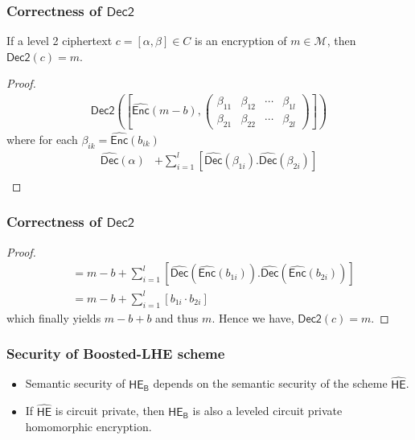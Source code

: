 \documentclass{beamer}
\begin{document}
\begin{frame}[t]
\frametitle{Correctness of $\mathsf{Dec2}$}
\begin{theorem}
If a level 2 ciphertext $c=[\alpha,\beta] \in C$ is an encryption of $m \in \mathcal{M}$, then $\mathsf{Dec2}(c)=m$.
\end{theorem}
\begin{proof}
\begin{align*}
\mathsf{Dec2}([\widehat{\mathsf{Enc}}(m-b), \left(\begin{array}{cccc} {\beta_{11}} & {\beta_{12}} & \cdots & {\beta_{1l}} \\ {\beta_{21}} & {\beta_{22}} & \cdots & {\beta_{2l}} \end{array} \right)])\nonumber
\end{align*}
where for each $\beta_{ik}=\widehat{\mathsf{Enc}}(b_{ik})$
\begin{align*}
\widehat{\mathsf{Dec}}(\alpha)&+\sum_{i=1}^l[ \widehat{\mathsf{Dec}}(\beta_{1i} ). \widehat{\mathsf{Dec}}(\beta_{2i} )]\nonumber\\ 
\end{align*}
\end{proof}
\end{frame}

\begin{frame}[t]
\frametitle{Correctness of $\mathsf{Dec2}$}
\begin{proof}
\begin{align*}
&= m-b+\sum_{i=1}^l [\widehat{\mathsf{Dec}}(\widehat{\mathsf{Enc}}(b_{1i}) ). \widehat{\mathsf{Dec}}(\widehat{\mathsf{Enc}}(b_{2i} ))]\nonumber\\
&= m-b+\sum_{i=1}^l [b_{1i} \cdot  b_{2i}]\nonumber
\end{align*}
which finally yields $m-b+b$ and thus $m$. Hence we have, $\mathsf{Dec2}(c)=m$.
\end{proof}

\end{frame}

\begin{frame}[t]
\frametitle{Security of Boosted-LHE scheme}

\begin{itemize}
\item  Semantic security of $\mathsf{HE_B}$ depends on the semantic security of the scheme $\mathsf{\widehat{HE}}$.
\vspace*{4mm}
\item If $\mathsf{\widehat{HE}}$ is circuit private, then $\mathsf{HE_B}$ is also a leveled circuit private homomorphic encryption.

\end{itemize}

\end{frame}
\end{document}
